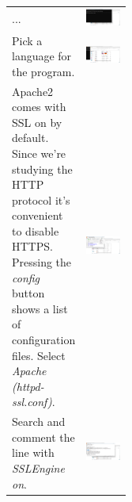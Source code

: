 \documentclass[11pt,a4paper]{report}
\begin{document}
\begin{flushleft}
\begin{tabular}{ p{0.3\linewidth} r }
... & \includegraphics[scale=0.3]{install_xampp13} \\
Pick a language for the program. & \includegraphics[scale=0.3]{install_xampp14} \\
Apache2 comes with SSL on by default. Since we're studying the HTTP protocol it's convenient to disable HTTPS. Pressing the \textit{config} button shows a list of
configuration files. Select \textit{Apache (httpd-ssl.conf)}. & \includegraphics[scale=0.3]{install_xampp15} \\
Search and comment the line with \textit{SSLEngine on}. & \includegraphics[scale=0.3]{install_xampp16} \\

\end{tabular}
\end{flushleft}
\end{document}
